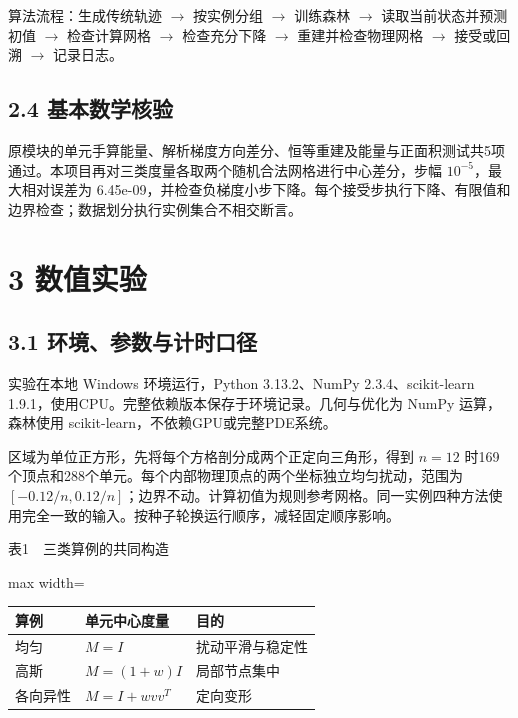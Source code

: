 \documentclass[UTF8,a4paper,zihao=5,fontset=fandol]{ctexart}
\begin{document}
算法流程：生成传统轨迹 $\to$ 按实例分组 $\to$ 训练森林 $\to$ 读取当前状态并预测初值 $\to$ 检查计算网格 $\to$ 检查充分下降 $\to$ 重建并检查物理网格 $\to$ 接受或回溯 $\to$ 记录日志。


\subsection*{2.4 基本数学核验}

原模块的单元手算能量、解析梯度方向差分、恒等重建及能量与正面积测试共5项通过。本项目再对三类度量各取两个随机合法网格进行中心差分，步幅 $10^{-5}$，最大相对误差为 6.45e-09，并检查负梯度小步下降。每个接受步执行下降、有限值和边界检查；数据划分执行实例集合不相交断言。


\newpage

\section*{3 数值实验}

\subsection*{3.1 环境、参数与计时口径}

实验在本地 Windows 环境运行，Python 3.13.2、NumPy 2.3.4、scikit-learn 1.9.1，使用CPU。完整依赖版本保存于环境记录。几何与优化为 NumPy 运算，森林使用 scikit-learn，不依赖GPU或完整PDE系统。


区域为单位正方形，先将每个方格剖分成两个正定向三角形，得到 $n=12$ 时169个顶点和288个单元。每个内部物理顶点的两个坐标独立均匀扰动，范围为 $[-0.12/n,0.12/n]$；边界不动。计算初值为规则参考网格。同一实例四种方法使用完全一致的输入。按种子轮换运行顺序，减轻固定顺序影响。


表1　三类算例的共同构造


\begin{center}\small\begin{adjustbox}{max width=\linewidth}\begin{tabular}{lll}\toprule
算例 & 单元中心度量 & 目的 \\
\midrule
均匀 & $M=I$ & 扰动平滑与稳定性 \\
高斯 & $M=(1+w)I$ & 局部节点集中 \\
各向异性 & $M=I+wvv^T$ & 定向变形 \\
\bottomrule\end{tabular}\end{adjustbox}\end{center}
\end{document}
